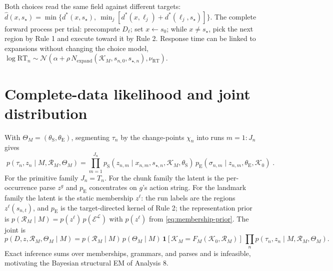 \documentclass[11pt]{article}
\begin{document}
\begin{center}
\end{center}

Both choices read the same field against different targets:
$\widehat d(x,s_\star)=\min\{d^{*}(x,s_\star),\ \min_j[d^{*}(x,\ell_j)+d^{*}(\ell_j,s_\star)]\}$.
The complete forward process per trial: precompute $D_\ell$; set $x\leftarrow s_0$; while
$x\neq s_\star$, pick the next region by Rule 1 and execute toward it by Rule 2. Response
time can be linked to expansions without changing the choice model,
$\log\mathrm{RT}_n\sim\mathcal N(\alpha+\rho\,N_{\mathrm{expand}}(\mathcal K_M,s_{n,0},s_{\star,n}),\nu_{\mathrm{RT}})$.

\section{Complete-data likelihood and joint distribution}

With $\Theta_M=(\theta_{\mathrm S},\theta_{\mathrm E})$, segmenting $\tau_n$ by the
change-points $\chi_n$ into runs $m=1{:}J_n$ gives
\begin{equation}
\boxed{\;
p(\tau_n,z_n\mid M,\mathcal R_M,\Theta_M)
=\prod_{m=1}^{J_n}
p_{\mathrm S}(z_{n,m}\mid x_{n,m},s_{\star,n},\mathcal K_M,\theta_{\mathrm S})\,
p_{\mathrm E}(\sigma_{n,m}\mid z_{n,m},\theta_{\mathrm E},\mathcal K_0)\;}.
\label{eq:like}
\end{equation}
For the primitive family $J_n=T_n$. For the chunk family the latent is the per-occurrence
parse $z^{g}$ and $p_{\mathrm E}$ concentrates on $g$'s action string. For the landmark
family the latent is the static membership $z^{\ell}$: the run labels are the regions
$z^{\ell}(s_{n,t})$, and $p_{\mathrm E}$ is the target-directed kernel of Rule 2; the
representation prior is $p(\mathcal R_M\mid M)=p(z^{\ell})\,p(\mathcal E^{\mathcal L})$ with
$p(z^{\ell})$ from \eqref{eq:membership-prior}. The joint is
\begin{equation}
p(D,z,\mathcal R_M,\Theta_M\mid M)
=p(\mathcal R_M\mid M)\,p(\Theta_M\mid M)\,
\mathbf 1[\mathcal K_M=F_M(\mathcal K_0,\mathcal R_M)]\,
\textstyle\prod_n p(\tau_n,z_n\mid M,\mathcal R_M,\Theta_M).
\label{eq:joint}
\end{equation}
Exact inference sums over memberships, grammars, and parses and is infeasible, motivating the
Bayesian structural EM of Analysis 8.
\end{document}
